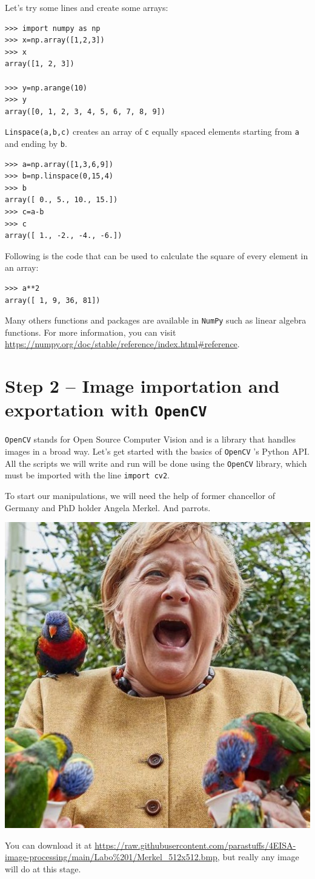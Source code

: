 \documentclass{labo}
\newcommand{\numpy}{\texttt{NumPy} }
\newcommand{\opencv}{\texttt{OpenCV} }
\begin{document}
Let’s try some lines and create some arrays:
\begin{verbatim}
>>> import numpy as np
>>> x=np.array([1,2,3])
>>> x
array([1, 2, 3])

>>> y=np.arange(10)
>>> y
array([0, 1, 2, 3, 4, 5, 6, 7, 8, 9])
\end{verbatim}

\texttt{Linspace(a,b,c)} creates an array of \texttt{c} equally spaced elements starting from \texttt{a} and ending by \texttt{b}.
\begin{verbatim}
>>> a=np.array([1,3,6,9])
>>> b=np.linspace(0,15,4)
>>> b
array([ 0., 5., 10., 15.])
>>> c=a-b
>>> c
array([ 1., -2., -4., -6.])
\end{verbatim}

Following is the code that can be used to calculate the square of every element in an array:

\begin{verbatim}
>>> a**2
array([ 1, 9, 36, 81])
\end{verbatim}

Many others functions and packages are available in \numpy such as linear algebra
functions. For more information, you can visit
\url{https://numpy.org/doc/stable/reference/index.html#reference}.




\section*{Step 2 -- Image importation and exportation with \opencv}
\opencv stands for Open Source Computer Vision and is a library that handles images in a broad way.
Let's get started with the basics of \opencv's Python API. All the scripts we will write and run
will be done using the \opencv library, which must be imported with the line \texttt{import cv2}.

To start our manipulations, we will need the help of former chancellor of Germany and PhD holder Angela Merkel. And parrots.

\begin{center}
\includegraphics[width=.35\textwidth]{Merkel_512x512.jpg}
\end{center}
You can download it at \url{https://raw.githubusercontent.com/parastuffs/4EISA-image-processing/main/Labo%201/Merkel_512x512.bmp}, but really any image will do at this stage.
\end{document}
